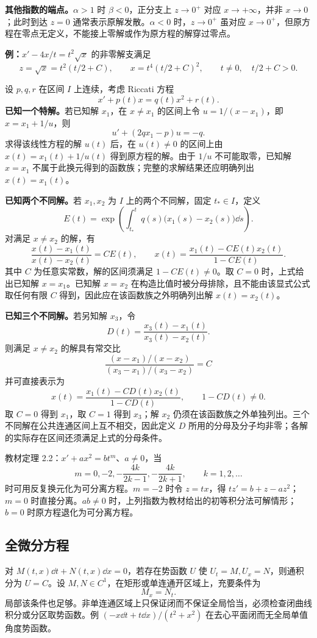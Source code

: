 \textbf{其他指数的端点。}$\alpha>1$ 时 $\beta<0$，正分支上 $z\to0^+$ 对应 $x\to+\infty$，并非 $x\to0$；此时到达 $z=0$ 通常表示原解发散。$\alpha<0$ 时，$z\to0^+$ 虽对应 $x\to0^+$，但原方程在零点无定义，不能接上零解或作为原方程的解穿过零点。

\textbf{例：}$x'-4x/t=t^2\sqrt{x}$ 的非零解支满足
\[
z=\sqrt{x}=t^2(t/2+C),\qquad x=t^4(t/2+C)^2,
\qquad t\ne0,\quad t/2+C>0.
\]

设 $p,q,r$ 在区间 $I$ 上连续，考虑 Riccati 方程
\[
x'+p(t)x=q(t)x^2+r(t).
\]
\textbf{已知一个特解。}若已知解 $x_1$，在 $x\ne x_1$ 的区间上令 $u=1/(x-x_1)$，即 $x=x_1+1/u$，则
\[
u'+(2qx_1-p)u=-q.
\]
求得该线性方程的解 $u(t)$ 后，在 $u(t)\ne0$ 的区间上由 $x(t)=x_1(t)+1/u(t)$ 得到原方程的解。由于 $1/u$ 不可能取零，已知解 $x=x_1$ 不属于此换元得到的函数族；完整的求解结果还应明确列出 $x(t)=x_1(t)$。

\textbf{已知两个不同解。}若 $x_1,x_2$ 为 $I$ 上的两个不同解，固定 $t_*\in I$，定义
\[
E(t)=\exp\!\left(\int_{t_*}^t q(s)\bigl(x_1(s)-x_2(s)\bigr)\dd s\right).
\]
对满足 $x\ne x_2$ 的解，有
\[
\frac{x(t)-x_1(t)}{x(t)-x_2(t)}=CE(t),\qquad
\boxed{x(t)=\frac{x_1(t)-CE(t)x_2(t)}{1-CE(t)}.}
\]
其中 $C$ 为任意实常数，解的区间须满足 $1-CE(t)\ne0$。取 $C=0$ 时，上式给出已知解 $x=x_1$。已知解 $x=x_2$ 在构造比值时被分母排除，且不能由该显式公式取任何有限 $C$ 得到，因此应在该函数族之外明确列出解 $x(t)=x_2(t)$。

\textbf{已知三个不同解。}若另知解 $x_3$，令
\[
D(t)=\frac{x_3(t)-x_1(t)}{x_3(t)-x_2(t)}.
\]
则满足 $x\ne x_2$ 的解具有常交比
\[
\frac{(x-x_1)/(x-x_2)}{(x_3-x_1)/(x_3-x_2)}=C
\]
并可直接表示为
\[
\boxed{x(t)=\frac{x_1(t)-CD(t)x_2(t)}{1-CD(t)},\qquad 1-CD(t)\ne0.}
\]
取 $C=0$ 得到 $x_1$，取 $C=1$ 得到 $x_3$；解 $x_2$ 仍须在该函数族之外单独列出。三个不同解在公共连通区间上互不相交，因此定义 $D$ 所用的分母及分子均非零；各解的实际存在区间还须满足上式的分母条件。

教材定理 2.2：$x'+a x^2=b t^m$、$a\ne0$，当
\[
m=0,-2,-\frac{4k}{2k-1},-\frac{4k}{2k+1},\qquad k=1,2,\ldots
\]
时可用反复换元化为可分离方程。$m=-2$ 时令 $z=tx$，得 $tz'=b+z-az^2$；$m=0$ 时直接分离。$ab\ne0$ 时，上列指数为教材给出的初等积分法可解情形；$b=0$ 时原方程退化为可分离方程。

\subsection{全微分方程}
对 $M(t,x)\dd t+N(t,x)\dd x=0$，若存在势函数 $U$ 使 $U_t=M,U_x=N$，则通积分为 $U=C$。设 $M,N\in C^1$，在矩形或单连通开区域上，充要条件为
\[
M_x=N_t.
\]
局部该条件也足够。非单连通区域上只保证闭而不保证全局恰当，必须检查闭曲线积分或分区取势函数。例 $(-x\dd t+t\dd x)/(t^2+x^2)$ 在去心平面闭而无全局单值角度势函数。

